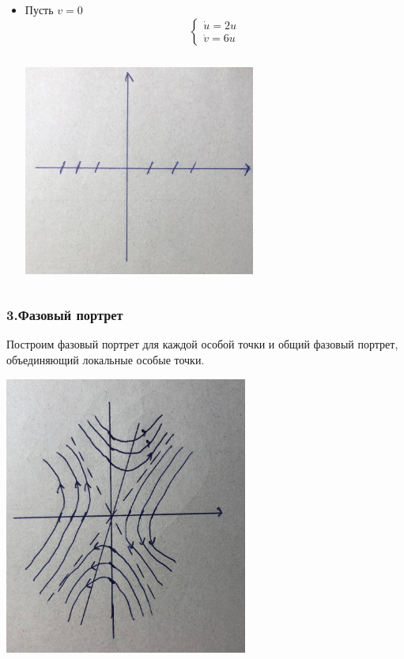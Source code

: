\documentclass[12pt]{article}
\begin{document}
\begin{itemize}
\begin{itemize}
\item Пусть $v = 0$
        \[
\begin{cases}
\dot{u} = 2u \\
\dot{v} = 6u
\end{cases}
\]
\begin{center}
\includegraphics[width=3in,height=3in]{system_two_for_zerov_5.jpeg}
\end{center}

\end{itemize}
  
\end{itemize}

\clearpage

\subsubsection{3.Фазовый портрет}

Построим фазовый портрет для каждой особой точки и общий фазовый портрет, объединяющий локальные особые точки.

\begin{center}
\includegraphics[width=0.6\textwidth]{phase_portret_sedlo5.png}
\end{center}
\end{document}
